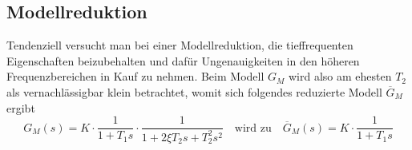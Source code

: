 \subsection{Modellreduktion }

Tendenziell versucht man bei einer Modellreduktion, die tieffrequenten Eigenschaften
beizubehalten und dafür Ungenauigkeiten in den höheren Frequenzbereichen in
Kauf zu nehmen. Beim Modell $G_M$ wird also am ehesten $T_2$ als vernachlässigbar
klein betrachtet, womit sich folgendes reduzierte Modell $\overline{G}_M$ ergibt
\[G_M(s)=K\cdot\frac{1}{1+T_1s}\cdot\frac{1}{1+2\xi T_2 s +T^2_2 s^2} \quad \text{wird zu} \quad \overline{G}_M(s)=K\cdot\frac{1}{1+T_1s}\]